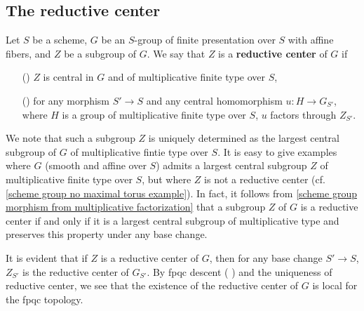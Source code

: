 \subsection{The reductive center}
\begin{definition}\label{scheme group fp affine fiber reductive center def}
Let $S$ be a scheme, $G$ be an $S$-group of finite presentation over $S$ with affine fibers, and $Z$ be a subgroup of $G$. We say that $Z$ is a \textbf{reductive center} of $G$ if
\begin{enumerate}
    \item[(\rmnum{1})] $Z$ is central in $G$ and of multiplicative finite type over $S$,
    \item[(\rmnum{2})] for any morphism $S'\to S$ and any central homomorphism $u:H\to G_{S'}$, where $H$ is a group of multiplicative finite type over $S$, $u$ factors through $Z_{S'}$.
\end{enumerate}
\end{definition}
We note that such a subgroup $Z$ is uniquely determined as the largest central subgroup of $G$ of multiplicative fintie type over $S$. It is easy to give examples where $G$ (smooth and affine over $S$) admits a largest central subgroup $Z$ of multiplicative finite type over $S$, but where $Z$ is not a reductive center (cf. \cref{scheme group no maximal torus example}). In fact, it follows from \cref{scheme group morphism from multiplicative factorization} that a subgroup $Z$ of $G$ is a reductive center if and only if it is a largest central subgroup of multiplicative type and preserves this property under any base change.\par
It is evident that if $Z$ is a reductive center of $G$, then for any base change $S'\to S$, $Z_{S'}$ is the reductive center of $G_{S'}$. By fpqc descent (\cite{SGA1} ) and the uniqueness of reductive center, we see that the existence of the reductive center of $G$ is local for the fpqc topology.

